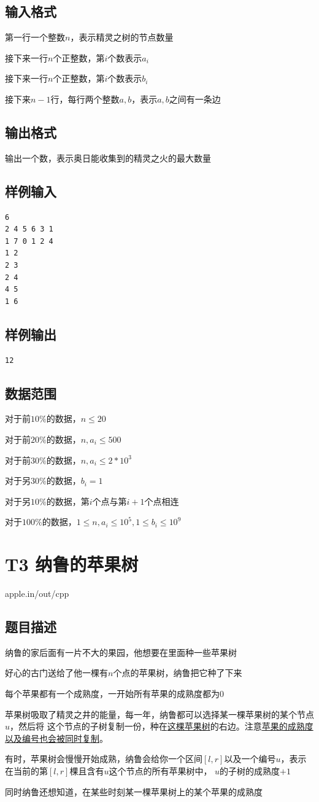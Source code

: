 \documentclass[12pt]{article}
\begin{document}
    \subsection{输入格式}
    第一行一个整数$n$，表示精灵之树的节点数量\par
    接下来一行$n$个正整数，第$i$个数表示$a_i$\par
    接下来一行$n$个正整数，第$i$个数表示$b_i$\par
    接下来$n-1$行，每行两个整数$a,b$，表示$a,b$之间有一条边
    \subsection{输出格式}
    输出一个数，表示奥日能收集到的精灵之火的最大数量
    \subsection{样例输入}
    \begin{lstlisting}
6
2 4 5 6 3 1
1 7 0 1 2 4
1 2
2 3
2 4
4 5
1 6
    \end{lstlisting}
    \subsection{样例输出}
    \begin{lstlisting}
12
    \end{lstlisting}
    \subsection{数据范围}
    对于前$10\%$的数据，$n\leq 20$\par
    对于前$20\%$的数据，$n,a_i\leq 500$\par
    对于前$30\%$的数据，$n,a_i\leq 2*10^3$\par
    对于另$30\%$的数据，$b_i=1$\par
    对于另$10\%$的数据，第$i$个点与第$i+1$个点相连\par
    对于$100\%$的数据，$1\leq n,a_i\leq 10^5,1\leq b_i\leq 10^9$
    \newpage
    \section{T3 纳鲁的苹果树}
    apple.in/out/cpp
    \subsection{题目描述}
    纳鲁的家后面有一片不大的果园，他想要在里面种一些苹果树\par
    好心的古门送给了他一棵有$n$个点的苹果树，纳鲁把它种了下来\par
    每个苹果都有一个成熟度，一开始所有苹果的成熟度都为$0$\par
    苹果树吸取了精灵之井的能量，每一年，纳鲁都可以选择某一棵苹果树的某个节点$u$，然后将
    这个节点的子树复制一份，种在\underline{这棵苹果树}的右边。注意\underline{苹果的成熟度以及编号也会被同时复制}。\par
    有时，苹果树会慢慢开始成熟，纳鲁会给你一个区间$[l,r]$以及一个编号$u$，表示在当前的第$[l,r]$棵且含有$u$这个节点的所有苹果树中，
    $u$的子树的成熟度$+1$\par
    同时纳鲁还想知道，在某些时刻某一棵苹果树上的某个苹果的成熟度\par
\end{document}
